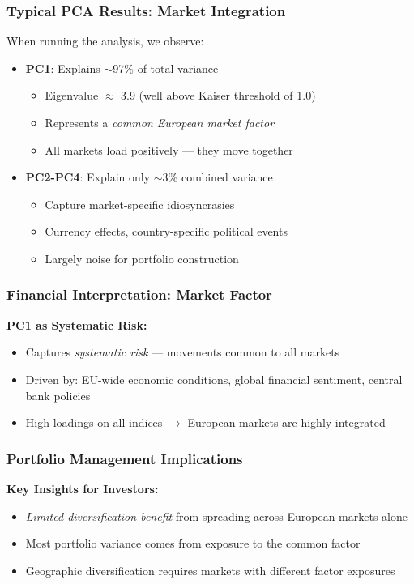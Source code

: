 \documentclass[aspectratio=169]{beamer}
\begin{document}
\begin{frame}
    \frametitle{Typical PCA Results: Market Integration}
    When running the analysis, we observe:
    \begin{itemize}
        \item \textbf{PC1}: Explains $\sim$97\% of total variance \pause
              \begin{itemize}
                  \item Eigenvalue $\approx$ 3.9 (well above Kaiser threshold of 1.0) \pause
                  \item Represents a \textit{common European market factor} \pause
                  \item All markets load positively — they move together \pause
              \end{itemize}
        \item \textbf{PC2-PC4}: Explain only $\sim$3\% combined variance \pause
              \begin{itemize}
                  \item Capture market-specific idiosyncrasies \pause
                  \item Currency effects, country-specific political events \pause
                  \item Largely noise for portfolio construction \pause
              \end{itemize}
    \end{itemize}
\end{frame}

\begin{frame}
    \frametitle{Financial Interpretation: Market Factor}
    \textbf{PC1 as Systematic Risk:}
    \begin{itemize}
        \item Captures \textit{systematic risk} — movements common to all markets \pause
        \item Driven by: EU-wide economic conditions, global financial sentiment, central bank policies \pause
        \item High loadings on all indices $\rightarrow$ European markets are highly integrated \pause
    \end{itemize}
\end{frame}

\begin{frame}
    \frametitle{Portfolio Management Implications}
    \textbf{Key Insights for Investors:}
    \begin{itemize}
        \item \textit{Limited diversification benefit} from spreading across European markets alone \pause
        \item Most portfolio variance comes from exposure to the common factor \pause
        \item Geographic diversification requires markets with different factor exposures \pause
    \end{itemize}
\end{frame}
\end{document}
